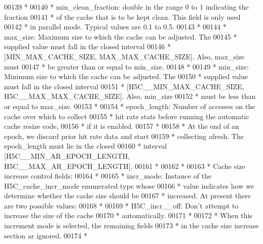 \begin{DoxyCode}
00139 \textcolor{comment}{ *}
00140 \textcolor{comment}{ * min\_clean\_fraction: double in the range 0 to 1 indicating the fraction}
00141 \textcolor{comment}{ *      of the cache that is to be kept clean.  This field is only used}
00142 \textcolor{comment}{ *      in parallel mode.  Typical values are 0.1 to 0.5.}
00143 \textcolor{comment}{ *}
00144 \textcolor{comment}{ * max\_size: Maximum size to which the cache can be adjusted.  The}
00145 \textcolor{comment}{ *      supplied value must fall in the closed interval}
00146 \textcolor{comment}{ *      [MIN\_MAX\_CACHE\_SIZE, MAX\_MAX\_CACHE\_SIZE].  Also, max\_size must}
00147 \textcolor{comment}{ *      be greater than or equal to min\_size.}
00148 \textcolor{comment}{ *}
00149 \textcolor{comment}{ * min\_size: Minimum size to which the cache can be adjusted.  The}
00150 \textcolor{comment}{ *      supplied value must fall in the closed interval}
00151 \textcolor{comment}{ *      [H5C\_\_MIN\_MAX\_CACHE\_SIZE, H5C\_\_MAX\_MAX\_CACHE\_SIZE].  Also, min\_size}
00152 \textcolor{comment}{ *      must be less than or equal to max\_size.}
00153 \textcolor{comment}{ *}
00154 \textcolor{comment}{ * epoch\_length: Number of accesses on the cache over which to collect}
00155 \textcolor{comment}{ *      hit rate stats before running the automatic cache resize code,}
00156 \textcolor{comment}{ *      if it is enabled.}
00157 \textcolor{comment}{ *}
00158 \textcolor{comment}{ *      At the end of an epoch, we discard prior hit rate data and start}
00159 \textcolor{comment}{ *      collecting afresh.  The epoch\_length must lie in the closed}
00160 \textcolor{comment}{ *      interval [H5C\_\_MIN\_AR\_EPOCH\_LENGTH, H5C\_\_MAX\_AR\_EPOCH\_LENGTH].}
00161 \textcolor{comment}{ *}
00162 \textcolor{comment}{ *}
00163 \textcolor{comment}{ * Cache size increase control fields:}
00164 \textcolor{comment}{ *}
00165 \textcolor{comment}{ * incr\_mode: Instance of the H5C\_cache\_incr\_mode enumerated type whose}
00166 \textcolor{comment}{ *      value indicates how we determine whether the cache size should be}
00167 \textcolor{comment}{ *      increased.  At present there are two possible values:}
00168 \textcolor{comment}{ *}
00169 \textcolor{comment}{ *      H5C\_incr\_\_off:  Don't attempt to increase the size of the cache}
00170 \textcolor{comment}{ *              automatically.}
00171 \textcolor{comment}{ *}
00172 \textcolor{comment}{ *              When this increment mode is selected, the remaining fields}
00173 \textcolor{comment}{ *              in the cache size increase section ar ignored.}
00174 \textcolor{comment}{ *}

\end{DoxyCode}

